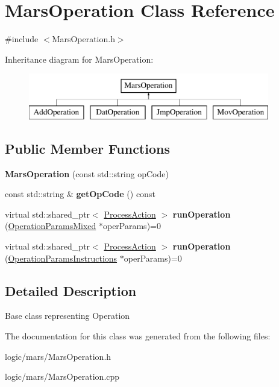 \hypertarget{classMarsOperation}{}\section{Mars\+Operation Class Reference}
\label{classMarsOperation}


{\ttfamily \#include $<$Mars\+Operation.\+h$>$}

Inheritance diagram for Mars\+Operation\+:\begin{figure}[H]
\begin{center}
\leavevmode
\includegraphics[height=2.000000cm]{classMarsOperation}
\end{center}
\end{figure}
\subsection*{Public Member Functions}
\begin{DoxyCompactItemize}
\item 
\mbox{\label{classMarsOperation_ad9897bc8c38be46877392fd999444de7}} 
{\bfseries Mars\+Operation} (const std\+::string op\+Code)
\item 
\mbox{\label{classMarsOperation_a81cea2fbb13b712743fb53edfdff1962}} 
const std\+::string \& {\bfseries get\+Op\+Code} () const
\item 
\mbox{\label{classMarsOperation_ac152b465684f88621ce38f01d60cab49}} 
virtual std\+::shared\+\_\+ptr$<$ \hyperlink{classProcessAction}{Process\+Action} $>$ {\bfseries run\+Operation} (\hyperlink{classOperationParamsMixed}{Operation\+Params\+Mixed} $\ast$oper\+Params)=0
\item 
\mbox{\label{classMarsOperation_a38f03421e2eaf1c38514c97a893bed27}} 
virtual std\+::shared\+\_\+ptr$<$ \hyperlink{classProcessAction}{Process\+Action} $>$ {\bfseries run\+Operation} (\hyperlink{classOperationParamsInstructions}{Operation\+Params\+Instructions} $\ast$oper\+Params)=0
\end{DoxyCompactItemize}


\subsection{Detailed Description}
Base class representing Operation 

The documentation for this class was generated from the following files\+:\begin{DoxyCompactItemize}
\item 
logic/mars/Mars\+Operation.\+h\item 
logic/mars/Mars\+Operation.\+cpp\end{DoxyCompactItemize}
